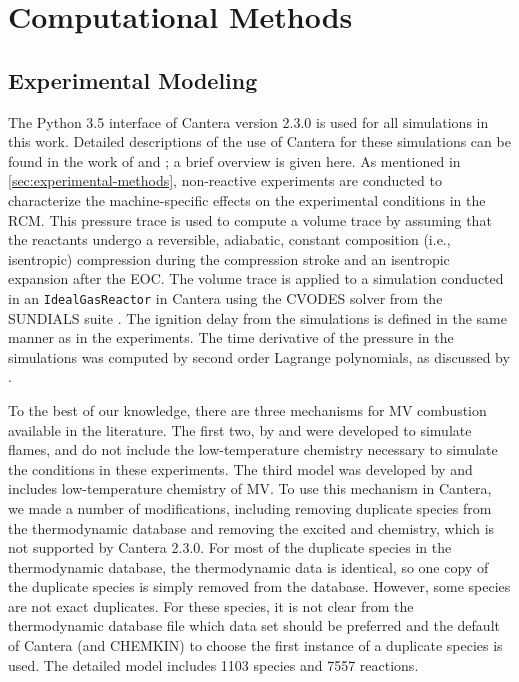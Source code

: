 \documentclass[12pt]{../ussci}
\begin{document}
\section{Computational Methods}\label{sec:computational-methods}
\subsection{Experimental Modeling}\label{sec:experimental-modeling}

The Python 3.5 interface of Cantera \autocite{cantera} version 2.3.0 is used for
all simulations in this work. Detailed descriptions of the use of Cantera for
these simulations can be found in the work of \textcite{Weber2016a} and
\textcite{Dames2016}; a brief overview is given here. As mentioned in
\cref{sec:experimental-methods}, non-reactive experiments are conducted to
characterize the machine-specific effects on the experimental conditions in the
RCM. This pressure trace is used to compute a volume trace by assuming that the
reactants undergo a reversible, adiabatic, constant composition (i.e.,
isentropic) compression during the compression stroke and an isentropic
expansion after the EOC. The volume trace is applied to a simulation conducted
in an \verb|IdealGasReactor| in Cantera \autocite{cantera} using the CVODES
solver from the SUNDIALS suite \autocite{Hindmarsh2005}. The ignition delay from
the simulations is defined in the same manner as in the experiments. The time
derivative of the pressure in the simulations was computed by second order
Lagrange polynomials, as discussed by \textcite{Chapra2010}.

To the best of our knowledge, there are three mechanisms for MV combustion
available in the literature. The first two, by \textcite{Dmitriev2015} and
\textcite{Korobeinichev2015} were developed to simulate flames, and do not
include the low-temperature chemistry necessary to simulate the conditions in
these experiments. The third model was developed by \textcite{Dievart2013} and
includes low-temperature chemistry of MV. To use this mechanism in Cantera, we
made a number of modifications, including removing duplicate species from the
thermodynamic database and removing the excited  and  chemistry,
which is not supported by Cantera 2.3.0. For most of the duplicate species in
the thermodynamic database, the thermodynamic data is identical, so one copy of
the duplicate species is simply removed from the database. However, some species
are not exact duplicates. For these species, it is not clear from the
thermodynamic database file which data set should be preferred and the default
of Cantera (and CHEMKIN) to choose the first instance of a duplicate species is
used. The detailed \textcite{Dievart2013} model includes 1103 species and 7557
reactions.
\end{document}
